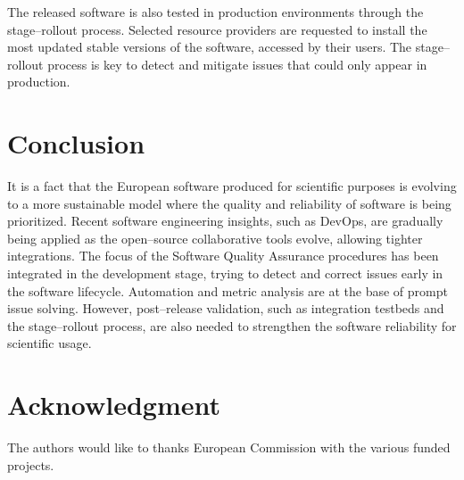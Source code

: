\documentclass[journal]{IEEEtran}
\begin{document}
The released software is also tested in production environments through the
stage--rollout process. Selected resource providers are requested to install
the most updated stable versions of the software, accessed by their users. The
stage--rollout process is key to detect and mitigate issues that could only
appear in production.

\section{Conclusion}
\label{sec:con}

It is a fact that the European software produced for scientific purposes is
evolving to a more sustainable model where the quality and reliability of
software is being prioritized. Recent software engineering insights, such as
DevOps, are gradually being applied as the open--source collaborative tools
evolve, allowing tighter integrations. The focus of the Software Quality
Assurance procedures has been integrated in the development stage, trying to
detect and correct issues early in the software lifecycle. Automation and
metric analysis are at the base of prompt issue solving. However, post--release
validation, such as integration testbeds and the stage--rollout process, are
also needed to strengthen the software reliability for scientific usage.

\section*{Acknowledgment}

The authors would like to thanks European Commission with the various funded
projects.
\end{document}
